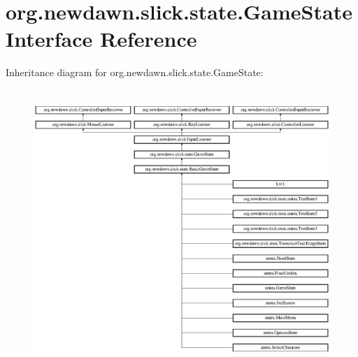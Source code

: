 \hypertarget{interfaceorg_1_1newdawn_1_1slick_1_1state_1_1_game_state}{}\section{org.\+newdawn.\+slick.\+state.\+Game\+State Interface Reference}
\label{interfaceorg_1_1newdawn_1_1slick_1_1state_1_1_game_state}
Inheritance diagram for org.\+newdawn.\+slick.\+state.\+Game\+State\+:\begin{figure}[H]
\begin{center}
\leavevmode
\includegraphics[height=10.542636cm]{interfaceorg_1_1newdawn_1_1slick_1_1state_1_1_game_state}
\end{center}
\end{figure}
